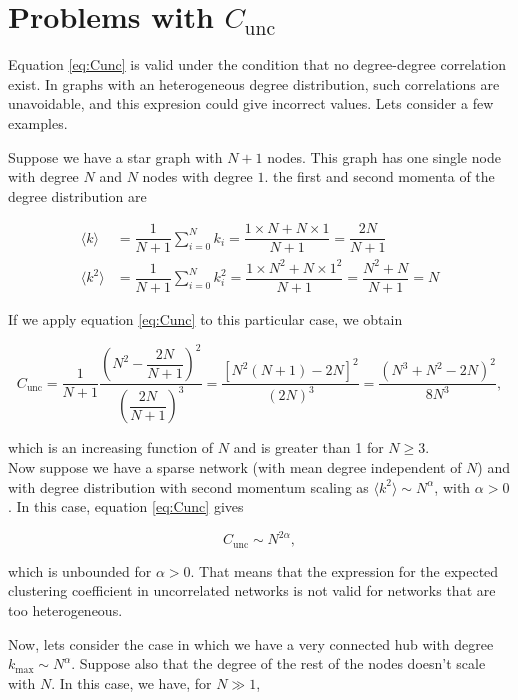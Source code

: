 \documentclass{article}
\begin{document}
\appendix
\section{Problems with $C_{\mathrm{unc}}$} \label{app:Cunc}

Equation \ref{eq:Cunc} is valid under the condition that no degree-degree correlation exist. In graphs with an heterogeneous degree distribution, such correlations are unavoidable, and this expresion could give incorrect values. Lets consider a few examples. 

Suppose we have a star graph with $N+1$ nodes. This graph has one single node with degree $N$ and $N$ nodes with degree $1$. the first and second momenta of the degree distribution are 

\begin{align}
    \langle k \rangle &= \dfrac{1}{N+1} \sum_{i=0}^N k_i = \dfrac{1\times N + N \times 1}{N+1} = \dfrac{2N}{N+1} \nonumber \\
    \langle k^2 \rangle &= \dfrac{1}{N+1} \sum_{i=0}^N k_i^2 = \dfrac{1\times N^2 + N \times 1^2}{N+1} = \dfrac{N^2 + N}{N+1} = N
\end{align}

If we apply equation \ref{eq:Cunc} to this particular case, we obtain

\begin{equation}
    C_{\mathrm{unc}} = \dfrac{1}{N+1}\dfrac{\left(N^2-\dfrac{2N}{N+1} \right)^2}{\left(\dfrac{2N}{N+1} \right)^3}= \dfrac{\left[N^2(N+1)-2N\right]^2}{(2N)^3} = \dfrac{(N^3+N^2-2N)^2}{8N^3},
\end{equation}

which is an increasing function of $N$ and is greater than 1 for $N \geq 3$.
\\

Now suppose we have a sparse network (with mean degree independent of $N$) and with degree distribution with second momentum scaling as $\langle k^2 \rangle \sim N^{\alpha}$, with $\alpha > 0$. In this case, equation \ref{eq:Cunc} gives

\begin{equation}
    C_{\mathrm{unc}} \sim N^{2\alpha},
\end{equation}

which is unbounded for $\alpha > 0$. That means that the expression for the expected clustering coefficient in uncorrelated networks is not valid for networks that are too heterogeneous. 

Now, lets consider the case in which we have a very connected hub with degree $k_{\mathrm{max}} \sim N^{\alpha}$. Suppose also that the degree of the rest of the nodes doesn't scale with $N$. In this case, we have, for $N\gg 1$, 
\end{document}
